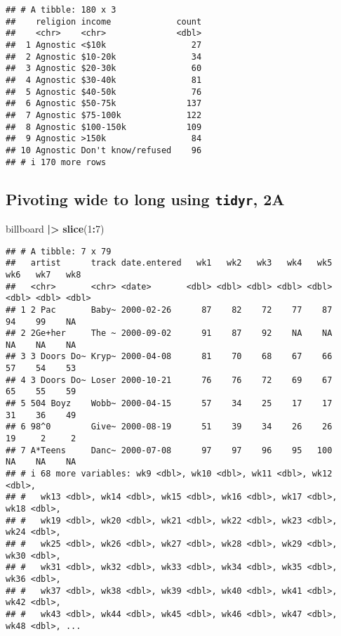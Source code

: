 \documentclass[
  11pt,
]{article}
\newenvironment{Shaded}{\begin{snugshade}}{\end{snugshade}}
\newcommand{\DecValTok}[1]{\textcolor[rgb]{0.00,0.00,0.81}{#1}}
\newcommand{\FunctionTok}[1]{\textcolor[rgb]{0.13,0.29,0.53}{\textbf{#1}}}
\newcommand{\NormalTok}[1]{#1}
\newcommand{\SpecialCharTok}[1]{\textcolor[rgb]{0.81,0.36,0.00}{\textbf{#1}}}
\begin{document}
\begin{verbatim}
## # A tibble: 180 x 3
##    religion income             count
##    <chr>    <chr>              <dbl>
##  1 Agnostic <$10k                 27
##  2 Agnostic $10-20k               34
##  3 Agnostic $20-30k               60
##  4 Agnostic $30-40k               81
##  5 Agnostic $40-50k               76
##  6 Agnostic $50-75k              137
##  7 Agnostic $75-100k             122
##  8 Agnostic $100-150k            109
##  9 Agnostic >150k                 84
## 10 Agnostic Don't know/refused    96
## # i 170 more rows
\end{verbatim}

\normalsize

\hypertarget{pivoting-wide-to-long-using-tidyr-2a}{%
\subsection{\texorpdfstring{Pivoting wide to long using \texttt{tidyr},
2A}{Pivoting wide to long using tidyr, 2A}}\label{pivoting-wide-to-long-using-tidyr-2a}}

\footnotesize

\begin{Shaded}
\begin{Highlighting}[]
\NormalTok{billboard }\SpecialCharTok{|\textgreater{}} \FunctionTok{slice}\NormalTok{(}\DecValTok{1}\SpecialCharTok{:}\DecValTok{7}\NormalTok{)}
\end{Highlighting}
\end{Shaded}

\begin{verbatim}
## # A tibble: 7 x 79
##   artist      track date.entered   wk1   wk2   wk3   wk4   wk5   wk6   wk7   wk8
##   <chr>       <chr> <date>       <dbl> <dbl> <dbl> <dbl> <dbl> <dbl> <dbl> <dbl>
## 1 2 Pac       Baby~ 2000-02-26      87    82    72    77    87    94    99    NA
## 2 2Ge+her     The ~ 2000-09-02      91    87    92    NA    NA    NA    NA    NA
## 3 3 Doors Do~ Kryp~ 2000-04-08      81    70    68    67    66    57    54    53
## 4 3 Doors Do~ Loser 2000-10-21      76    76    72    69    67    65    55    59
## 5 504 Boyz    Wobb~ 2000-04-15      57    34    25    17    17    31    36    49
## 6 98^0        Give~ 2000-08-19      51    39    34    26    26    19     2     2
## 7 A*Teens     Danc~ 2000-07-08      97    97    96    95   100    NA    NA    NA
## # i 68 more variables: wk9 <dbl>, wk10 <dbl>, wk11 <dbl>, wk12 <dbl>,
## #   wk13 <dbl>, wk14 <dbl>, wk15 <dbl>, wk16 <dbl>, wk17 <dbl>, wk18 <dbl>,
## #   wk19 <dbl>, wk20 <dbl>, wk21 <dbl>, wk22 <dbl>, wk23 <dbl>, wk24 <dbl>,
## #   wk25 <dbl>, wk26 <dbl>, wk27 <dbl>, wk28 <dbl>, wk29 <dbl>, wk30 <dbl>,
## #   wk31 <dbl>, wk32 <dbl>, wk33 <dbl>, wk34 <dbl>, wk35 <dbl>, wk36 <dbl>,
## #   wk37 <dbl>, wk38 <dbl>, wk39 <dbl>, wk40 <dbl>, wk41 <dbl>, wk42 <dbl>,
## #   wk43 <dbl>, wk44 <dbl>, wk45 <dbl>, wk46 <dbl>, wk47 <dbl>, wk48 <dbl>, ...
\end{verbatim}
\end{document}
